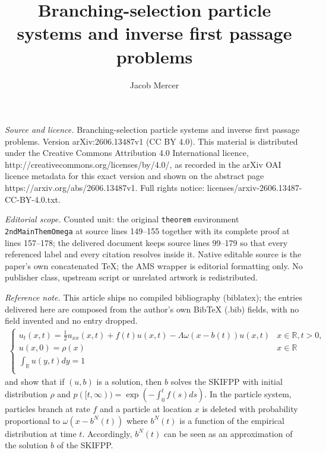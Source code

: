 \documentclass[10pt,a4paper]{amsart}
\newcommand{\B}[1]{\mathbb{#1}}
\begin{document}
\title[Branching-selection particle systems and inverse first passa]{Branching-selection particle systems and inverse first passage problems}
\author{Jacob Mercer}
\date{}
\maketitle
\noindent\emph{Source and licence.} Branching-selection particle systems and inverse first passage problems. Version arXiv:2606.13487v1 (CC BY 4.0). This material is distributed under the Creative Commons Attribution 4.0 International licence, http://creativecommons.org/licenses/by/4.0/, as recorded in the arXiv OAI licence metadata for this exact version and shown on the abstract page https://arxiv.org/abs/2606.13487v1. Full rights notice: licenses/arxiv-2606.13487-CC-BY-4.0.txt.\par\smallskip
\noindent\textit{Editorial scope.} Counted unit: the original \texttt{theorem} environment \texttt{2ndMainThemOmega} at source lines 149--155 together with its complete proof at lines 157--178; the delivered document keeps source lines 99--179 so that every referenced label and every citation resolves inside it. Native editable source is the paper's own concatenated TeX; the AMS wrapper is editorial formatting only. No publisher class, upstream script or unrelated artwork is redistributed.
\par\smallskip\noindent\textit{Reference note.} This article ships no compiled bibliography (biblatex); the entries delivered here are composed from the author's own BibTeX (.bib) fields, with no field invented and no entry dropped.
\begin{align} \label{omegaHydroLim}
    \begin{cases}
    u_t(x,t)=\frac{1}{2}u_{xx}(x,t) + f(t)u(x,t) - \Lambda\omega(x-b(t))u(x,t) & x\in \B{R}, t>0, \\
    u(x,0)=\rho(x) & x\in \B{R}\\
    \int_\B{R} u(y,t)dy=1\\
\end{cases}
\end{align}
and show that if $(u,b)$ is a solution, then $b$ solves the SKIFPP with initial distribution $\rho$ and $p([t,\infty))=\exp(-\int_0^t f(s)ds)$. In the particle system, particles branch at rate $f$ and a particle at location $x$ is deleted with probability proportional to $\omega(x-b^N(t))$ where $b^N(t)$ is a function of the empirical distribution at time $t$. Accordingly, $b^N(t)$ can be seen as an approximation of the solution $b$ of the SKIFPP. 
\end{document}
